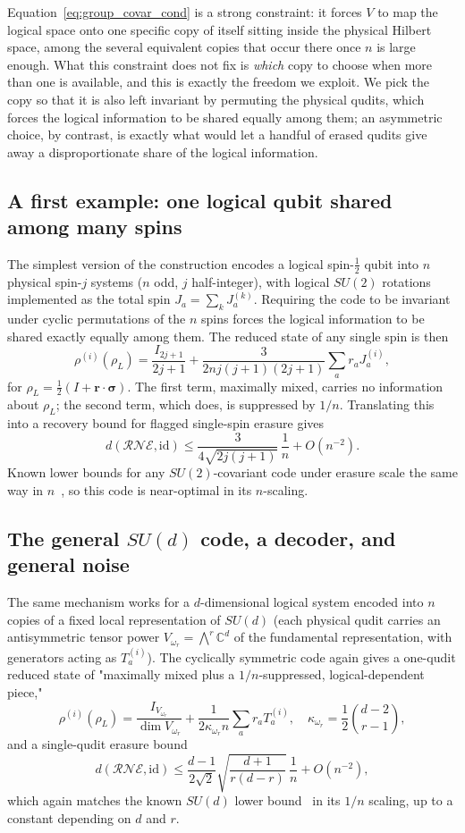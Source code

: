 \documentclass[10pt,twocolumn,superscriptaddress,aps,amsmath,amssymb,citeautoscript,floatfix,prx]{revtex4-2}
\theoremstyle{plain}
\theoremstyle{plain}
\theoremstyle{plain}
\theoremstyle{plain}
\theoremstyle{plain}
\theoremstyle{plain}
\begin{document}
Equation~\eqref{eq:group_covar_cond} is a strong constraint: it forces $V$ to map the logical space onto one specific copy of itself sitting inside the physical Hilbert space, among the several equivalent copies that occur there once $n$ is large enough. What this constraint does not fix is \emph{which} copy to choose when more than one is available, and this is exactly the freedom we exploit. We pick the copy so that it is also left invariant by permuting the physical qudits, which forces the logical information to be shared equally among them; an asymmetric choice, by contrast, is exactly what would let a handful of erased qudits give away a disproportionate share of the logical information.
 
\subsection{A first example: one logical qubit shared among many spins}\label{subsec:summary_su2}
 
The simplest version of the construction encodes a logical spin-$\tfrac12$ qubit into $n$ physical spin-$j$ systems ($n$ odd, $j$ half-integer), with logical $SU(2)$ rotations implemented as the total spin $J_a=\sum_k J_a^{(k)}$. Requiring the code to be invariant under cyclic permutations of the $n$ spins forces the logical information to be shared exactly equally among them. The reduced state of any single spin is then
$$
\rho^{(i)}(\rho_L)=\frac{I_{2j+1}}{2j+1}+\frac{3}{2nj(j+1)(2j+1)}\sum_a r_aJ_a^{(i)},
$$
for $\rho_L=\tfrac12(I+\mathbf r\cdot\boldsymbol\sigma)$. The first term, maximally mixed, carries no information about $\rho_L$; the second term, which does, is suppressed by $1/n$. Translating this into a recovery bound for flagged single-spin erasure gives
$$
d(\mathcal R\mathcal N\mathcal E,\mathrm{id})\le \frac{3}{4\sqrt{2j(j+1)}}\,\frac1n+O(n^{-2}).
$$
Known lower bounds for any $SU(2)$-covariant code under erasure scale the same way in $n$~\cite{Faist2020}, so this code is near-optimal in its $n$-scaling.
 
\subsection{The general \texorpdfstring{$SU(d)$}{SU(d)} code, a decoder, and general noise}\label{subsec:summary_sud}
 
The same mechanism works for a $d$-dimensional logical system encoded into $n$ copies of a fixed local representation of $SU(d)$ (each physical qudit carries an antisymmetric tensor power $V_{\omega_r}=\bigwedge^r\mathbb C^d$ of the fundamental representation, with generators acting as $T_a^{(i)}$). The cyclically symmetric code again gives a one-qudit reduced state of "maximally mixed plus a $1/n$-suppressed, logical-dependent piece,"
$$
\rho^{(i)}(\rho_L)=\frac{I_{V_{\omega_r}}}{\dim V_{\omega_r}}+\frac{1}{2\kappa_{\omega_r}n}\sum_a r_aT_a^{(i)},\quad \kappa_{\omega_r}=\frac12\binom{d-2}{r-1},
$$
and a single-qudit erasure bound
$$
d(\mathcal R\mathcal N\mathcal E,\mathrm{id})\le \frac{d-1}{2\sqrt2}\sqrt{\frac{d+1}{r(d-r)}}\,\frac1n+O(n^{-2}),
$$
which again matches the known $SU(d)$ lower bound~\cite{Faist2020} in its $1/n$ scaling, up to a constant depending on $d$ and $r$.
 
\end{document}
